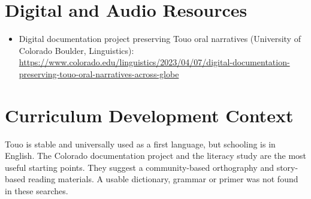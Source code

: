 \documentclass[12pt]{article}
\begin{document}
\section{Digital and Audio Resources}
\begin{itemize}
\item Digital documentation project preserving Touo oral narratives (University of Colorado Boulder, Linguistics): \url{https://www.colorado.edu/linguistics/2023/04/07/digital-documentation-preserving-touo-oral-narratives-across-globe}
\end{itemize}

\section{Curriculum Development Context}
Touo is stable and universally used as a first language, but schooling is in English. The Colorado documentation project and the literacy study are the most useful starting points. They suggest a community-based orthography and story-based reading materials. A usable dictionary, grammar or primer was not found in these searches.
\end{document}
